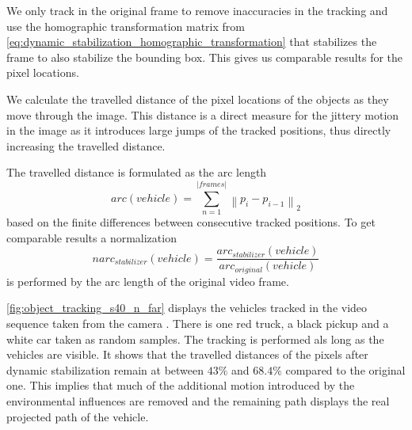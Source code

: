 We only track in the original frame to remove inaccuracies in the tracking and use the homographic transformation matrix from \autoref{eq:dynamic_stabilization_homographic_transformation} that stabilizes the frame to also stabilize the bounding box.
This gives us comparable results for the pixel locations. 

We calculate the travelled distance of the pixel locations of the objects as they move through the image. 
This distance is a direct measure for the jittery motion in the image as it introduces large jumps of the tracked positions, thus directly increasing the travelled distance.

The travelled distance is formulated as the arc length
\begin{equation}
    arc(vehicle) = \sum_{n = 1}^{\left\lvert frames \right\rvert } \left\lVert 
        p_{i} - p_{i-1}
    \right\rVert _2
\end{equation} 
based on the finite differences between consecutive tracked positions.
To get comparable results a normalization 
\begin{equation}
    narc_{stabilizer}(vehicle) = 
    \frac{arc_{stabilizer}(vehicle)}{arc_{original}(vehicle)}
\end{equation} 
is performed by the arc length of the original video frame.

\autoref{fig:object_tracking_s40_n_far} displays the vehicles tracked in the video sequence taken from the camera . 
There is one red truck, a black pickup and a white car taken as random samples.
The tracking is performed als long as the vehicles are visible.
It shows that the travelled distances of the pixels after dynamic stabilization remain at between $43\%$ and $68.4\%$ compared to the original one.   
This implies that much of the additional motion introduced by the environmental influences are removed and the remaining path displays the real projected path of the vehicle. 

